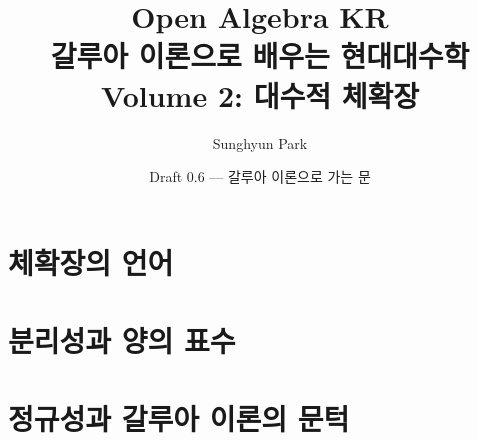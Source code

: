 \documentclass[11pt,openany]{book}
\title{\Huge Open Algebra KR\\[8pt]\Large 갈루아 이론으로 배우는 현대대수학\\[18pt]\large Volume 2: 대수적 체확장}
\author{Sunghyun Park}
\date{Draft 0.6 --- 갈루아 이론으로 가는 문}
\theoremstyle{definition}
\theoremstyle{remark}
\begin{document}
\frontmatter
\maketitle

\tableofcontents


\mainmatter
\part{체확장의 언어}
\setcounter{chapter}{-1}




\part{분리성과 양의 표수}



\part{정규성과 갈루아 이론의 문턱}



\backmatter


\end{document}
